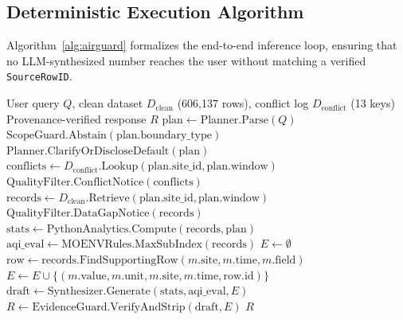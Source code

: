 \documentclass[conference]{IEEEtran}
\begin{document}
\subsection{Deterministic Execution Algorithm}
Algorithm~\ref{alg:airguard} formalizes the end-to-end inference loop, ensuring that no LLM-synthesized number reaches the user without matching a verified \texttt{SourceRowID}.

\begin{algorithm}[!t]
\caption{AirGuard AI Deterministic Provenance-Grounded Execution}
\label{alg:airguard}
\begin{algorithmic}[1]
\Require User query $Q$, clean dataset $D_{\text{clean}}$ (606,137 rows), conflict log $D_{\text{conflict}}$ (13 keys)
\Ensure Provenance-verified response $R$
\State $\text{plan} \gets \text{Planner.Parse}(Q)$ 
    \State \Return $\text{ScopeGuard.Abstain}(\text{plan.boundary\_type})$
\EndIf
{}
    \State \Return $\text{Planner.ClarifyOrDiscloseDefault}(\text{plan})$
\EndIf
\State $\text{conflicts} \gets D_{\text{conflict}}.\text{Lookup}(\text{plan.site\_id}, \text{plan.window})$
    \State \Return $\text{QualityFilter.ConflictNotice}(\text{conflicts})$
\EndIf
\State $\text{records} \gets D_{\text{clean}}.\text{Retrieve}(\text{plan.site\_id}, \text{plan.window})$
    \State \Return $\text{QualityFilter.DataGapNotice}(\text{records})$
\EndIf
\State $\text{stats} \gets \text{PythonAnalytics.Compute}(\text{records}, \text{plan})$
\State $\text{aqi\_eval} \gets \text{MOENVRules.MaxSubIndex}(\text{records})$
\State $E \gets \emptyset$
    \State $\text{row} \gets \text{records.FindSupportingRow}(m.\text{site}, m.\text{time}, m.\text{field})$
    \State $E \gets E \cup \{(m.\text{value}, m.\text{unit}, m.\text{site}, m.\text{time}, \text{row.id})\}$
\EndFor
\State $\text{draft} \gets \text{Synthesizer.Generate}(\text{stats}, \text{aqi\_eval}, E)$
\State $R \gets \text{EvidenceGuard.VerifyAndStrip}(\text{draft}, E)$
\State \Return $R$
\end{algorithmic}
\end{algorithm}
\end{document}
